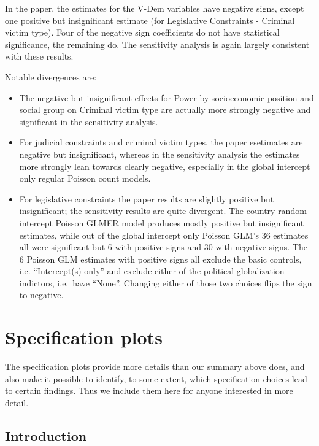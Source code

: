 \documentclass[]{article}
\providecommand{\tightlist}{%
  \setlength{\itemsep}{0pt}\setlength{\parskip}{0pt}}
\begin{document}
In the paper, the estimates for the V-Dem variables have negative signs,
except one positive but insignificant estimate (for Legislative
Constraints - Criminal victim type). Four of the negative sign
coefficients do not have statistical significance, the remaining do. The
sensitivity analysis is again largely consistent with these results.

Notable divergences are:

\begin{itemize}
\tightlist
\item
  The negative but insignificant effects for Power by socioeconomic
  position and social group on Criminal victim type are actually more
  strongly negative and significant in the sensitivity analysis.
\item
  For judicial constraints and criminal victim types, the paper
  esetimates are negative but insignificant, whereas in the sensitivity
  analysis the estimates more strongly lean towards clearly negative,
  especially in the global intercept only regular Poisson count models.
\item
  For legislative constraints the paper results are slightly positive
  but insignificant; the sensitivity results are quite divergent. The
  country random intercept Poisson GLMER model produces mostly positive
  but insignificant estimates, while out of the global intercept only
  Poisson GLM's 36 estimates all were significant but 6 with positive
  signs and 30 with negative signs. The 6 Poisson GLM estimates with
  positive signs all exclude the basic controls, i.e. ``Intercept(s)
  only'' and exclude either of the political globalization indictors,
  i.e.~have ``None''. Changing either of those two choices flips the
  sign to negative.
\end{itemize}

\clearpage

\hypertarget{specification-plots}{%
\section{Specification plots}\label{specification-plots}}

The specification plots provide more details than our summary above
does, and also make it possible to identify, to some extent, which
specification choices lead to certain findings. Thus we include them
here for anyone interested in more detail.

\hypertarget{introduction}{%
\subsection{Introduction}\label{introduction}}
\end{document}
